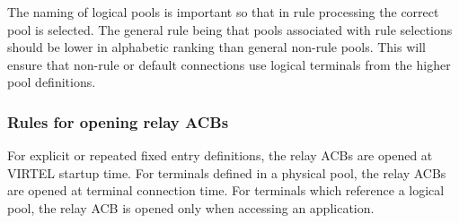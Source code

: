 \documentclass[letterpaper,10pt,english]{sphinxmanual}
\begin{document}
\begin{sphinxVerbatim}[commandchars=\\\{\}]
                           
                                
                                       
                                       
\end{sphinxVerbatim}

The naming of logical pools is important so that in rule processing the correct pool is selected. The general rule being that pools associated with rule selections should be lower in alphabetic ranking than general non-rule pools. This will ensure that non-rule or default connections use logical terminals from the higher pool definitions.


\subsubsection{Rules for opening relay ACBs}
\label{\detokenize{connectivity_guide:rules-for-opening-relay-acbs}}
For explicit or repeated fixed entry definitions, the relay ACBs are opened at VIRTEL startup time. For terminals defined in a physical pool, the relay ACBs are opened at terminal connection time. For terminals which reference a logical pool, the relay ACB is opened only when accessing an application.
\end{document}
